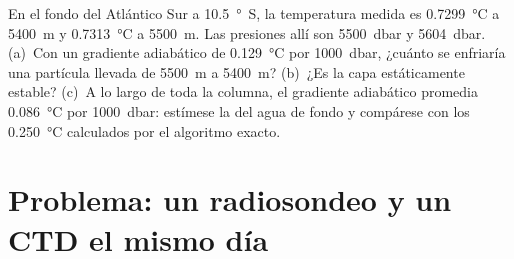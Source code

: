 \begin{exercise}[$\star\star\star$]\label{exo:b1:fluid-envelopes-structure:12}
En el fondo del Atlántico Sur a \qty{10.5}{\degree S}, la temperatura medida es \qty{0.7299}{\celsius} a \qty{5400}{m} y \qty{0.7313}{\celsius}
a \qty{5500}{m}. Las presiones allí son \qty{5500}{dbar} y \qty{5604}{dbar}. (a)~Con un gradiente adiabático de \qty{0.129}{\celsius} por \qty{1000}{dbar}, ¿cuánto se enfriaría una partícula llevada de \qty{5500}{m} a \qty{5400}{m}? (b)~¿Es la capa estáticamente estable? (c)~A lo largo de toda la columna, el gradiente adiabático promedia \qty{0.086}{\celsius} por \qty{1000}{dbar}: estímese la  del agua de fondo y compárese con los \qty{0.250}{\celsius} calculados por el algoritmo exacto.
\end{exercise}

\section{Problema: un radiosondeo y un CTD el mismo día}

